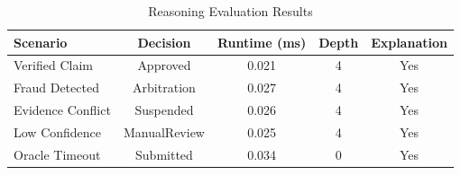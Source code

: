 \begin{table}[t]
\centering
\caption{Reasoning Evaluation Results}
\label{tab:rq2results}
\begin{tabular}{lcccc}
\toprule
Scenario & Decision & Runtime (ms) & Depth & Explanation\\
\midrule
Verified Claim & Approved & 0.021 & 4 & Yes\\
Fraud Detected & Arbitration & 0.027 & 4 & Yes\\
Evidence Conflict & Suspended & 0.026 & 4 & Yes\\
Low Confidence & ManualReview & 0.025 & 4 & Yes\\
Oracle Timeout & Submitted & 0.034 & 0 & Yes\\
\bottomrule
\end{tabular}
\end{table}
